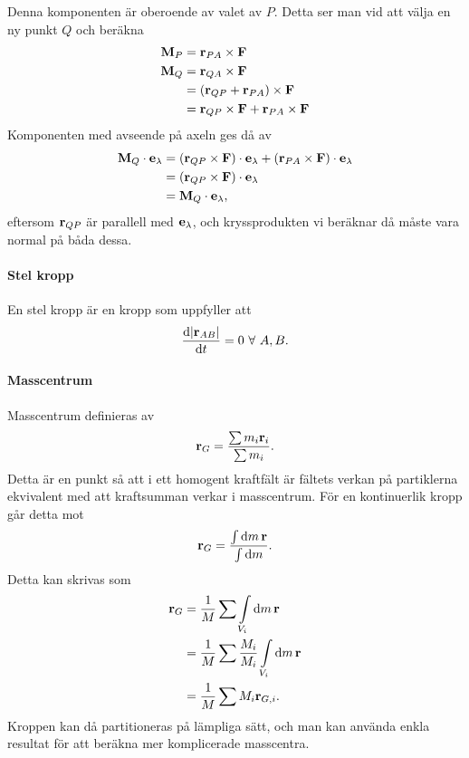 Denna komponenten är oberoende av valet av $P$. Detta ser man vid att välja en ny punkt $Q$ och beräkna
\begin{align*}
	\vect{M}_P &= \vect{r}_{PA}\times\vect{F} \\
	\vect{M}_Q &= \vect{r}_{QA}\times\vect{F} \\
	           &= (\vect{r}_{QP} + \vect{r}_{PA})\times\vect{F} \\
	           &= \vect{r}_{QP}\times\vect{F} + \vect{r}_{PA}\times\vect{F}
\end{align*}
Komponenten med avseende på axeln ges då av
\begin{align*}
	\vect{M}_Q\cdot\vect{e}_\lambda &= (\vect{r}_{QP}\times\vect{F})\cdot\vect{e}_\lambda + (\vect{r}_{PA}\times\vect{F})\cdot\vect{e}_\lambda \\
	                                &= (\vect{r}_{QP}\times\vect{F})\cdot\vect{e}_\lambda \\
	                                &= \vect{M}_Q\cdot\vect{e}_\lambda,
\end{align*}
eftersom $\vect{r}_{QP}$ är parallell med $\vect{e}_\lambda$, och kryssprodukten vi beräknar då måste vara normal på båda dessa.

\paragraph{Stel kropp}
En stel kropp är en kropp som uppfyller att
\begin{align*}
	\dv{\abs{\vect{r}_{AB}}}{t} = 0\ \forall\ A, B. 
\end{align*}

\paragraph{Masscentrum}
Masscentrum definieras av
\begin{align*}
	\vect{r}_G = \frac{\sum m_i\vect{r}_i}{\sum m_i}.
\end{align*}
Detta är en punkt så att i ett homogent kraftfält är fältets verkan på partiklerna ekvivalent med att kraftsumman verkar i masscentrum. För en kontinuerlik kropp går detta mot
\begin{align*}
	\vect{r}_G = \frac{\int\dd{m}\vect{r}}{\int\dd{m}}.
\end{align*}
Detta kan skrivas som
\begin{align*}
	\vect{r}_G &= \frac{1}{M}\sum\int\limits_{V_i}\dd{m}\vect{r} \\
	           &= \frac{1}{M}\sum\frac{M_i}{M_i}\int\limits_{V_i}\dd{m}\vect{r} \\
	           &= \frac{1}{M}\sum M_i\vect{r}_{G, i}.
\end{align*}
Kroppen kan då partitioneras på lämpliga sätt, och man kan använda enkla resultat för att beräkna mer komplicerade masscentra.

